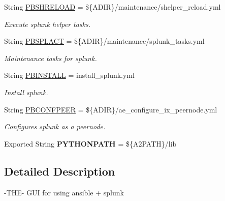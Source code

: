 \begin{DoxyCompactItemize}
String \mbox{\hyperlink{ansible__engine_8sh_a5abc6709ccffb498c492099b1770c0d6}{P\+B\+S\+H\+R\+E\+L\+O\+AD}} = \$\{A\+D\+IR\}/maintenance/shelper\+\_\+reload.\+yml
\begin{DoxyCompactList}\small\item\em Execute splunk helper tasks. \end{DoxyCompactList}\item 
String \mbox{\hyperlink{ansible__engine_8sh_a07a65ca55f4f8bec6ba69c3d4f05db1c}{P\+B\+S\+P\+L\+A\+CT}} = \$\{A\+D\+IR\}/maintenance/splunk\+\_\+tasks.\+yml
\begin{DoxyCompactList}\small\item\em Maintenance tasks for splunk. \end{DoxyCompactList}\item 
String \mbox{\hyperlink{ansible__engine_8sh_a5cd762e578035a4804ac18c2629c13e7}{P\+B\+I\+N\+S\+T\+A\+LL}} = install\+\_\+splunk.\+yml
\begin{DoxyCompactList}\small\item\em Install splunk. \end{DoxyCompactList}\item 
String \mbox{\hyperlink{ansible__engine_8sh_ac1b51f4881d2cb0122ebe0fa5dadf285}{P\+B\+C\+O\+N\+F\+P\+E\+ER}} = \$\{A\+D\+IR\}/ae\+\_\+configure\+\_\+ix\+\_\+peernode.\+yml
\begin{DoxyCompactList}\small\item\em Configures splunk as a peernode. \end{DoxyCompactList}\item 
\mbox{\label{ansible__engine_8sh_aa303602d6c6a608b35e3c950471b05bd}} 
Exported String {\bfseries P\+Y\+T\+H\+O\+N\+P\+A\+TH} = \$\{A2\+P\+A\+TH\}/lib
\end{DoxyCompactItemize}


\subsection{Detailed Description}
-\/\+T\+H\+E-\/ G\+UI for using ansible + splunk 

